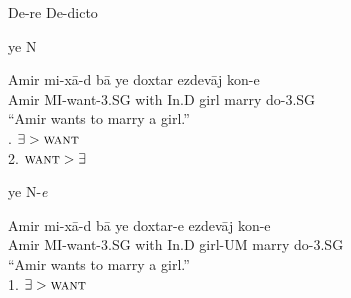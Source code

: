 \documentclass[10pt]{beamer}
\begin{document}
\begin {frame} {De-re De-dicto}

\begin {exampleblock} {ye N}
	\begin {exe}
		\ex \label{} \gll	Amir mi-x\={a}-d b\={a} ye doxtar ezdev\={a}j kon-e\\
					Amir {\scriptsize MI}-want-{\scriptsize 3.SG} with {\scriptsize In.D} girl marry do-{\scriptsize 3.SG}\\
			``Amir wants to marry a girl.'' \\ . $\exists > \textsc{want}$ \\2. $\textsc{want} > \exists$\\
	\end {exe}
\end {exampleblock}
\pause
\begin {exampleblock} {ye N-\emph{{\color {red}e}}}
	\begin {exe}
		\ex \label{} \gll	Amir mi-x\={a}-d b\={a} ye doxtar-{\color {red}e} ezdev\={a}j kon-e\\
					Amir {\scriptsize MI}-want-{\scriptsize 3.SG} with {\scriptsize In.D} girl-{\scriptsize UM} marry do-{\scriptsize 3.SG}\\
			``Amir wants to marry a girl.'' \\ 1. $\exists > \textsc{want}$\\
	\end {exe}
\end {exampleblock}

\end {frame}

\end{document}
